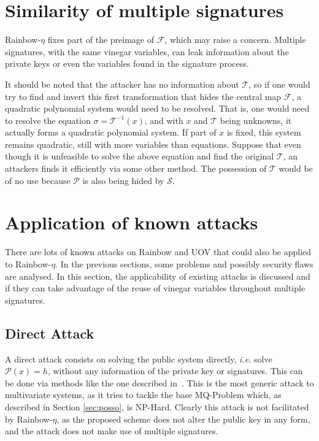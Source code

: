 \documentclass{ufsctex/ufsctex}
\begin{document}
\section{Similarity of multiple signatures}

Rainbow-$\eta$ fixes part of the preimage of $\mathcal{F}$, which may raise a
concern. Multiple signatures, with the same vinegar variables, can leak
information about the private keys or even the variables found in the signature
process.

It should be noted that the attacker has no information about $\mathcal{T}$, so
if one would try to find and invert this first transformation that hides the
central map $\mathcal{F}$, a quadratic polynomial system would need to be
resolved. That is, one would need to resolve the equation $\sigma =
\mathcal{T}^{-1}(x)$, and with $x$ and $\mathcal{T}$ being unknowns, it
actually forms a quadratic polynomial system. If part of $x$ is fixed, this
system remains quadratic, still with more variables than equations. Suppose
that even though it is unfeasible to solve the above equation and find the
original $\mathcal{T}$, an attackers finds it efficiently via some other
method. The possession of $\mathcal{T}$ would be of no use because
$\mathcal{P}$ is also being hided by $\mathcal{S}$. 

\section{Application of known attacks}

There are lots of known attacks on Rainbow and UOV that could also be applied
to Rainbow-$\eta$. In the previous sections, some problems and possibly
security flaws are analysed. In this section, the applicability of existing
attacks is discussed and if they can take advantage of the reuse of vinegar
variables throughout multiple signatures.

\subsection{Direct Attack}

A direct attack consists on solving the public system directly, \textit{i.e.}
solve $\mathcal{P}(x) = h$, without any information of the private key or
signatures. This can be done via methods like the one described
in~\cite{bettale2009hybrid}. This is the most generic attack to multivariate
systems, as it tries to tackle the base MQ-Problem which, as described in
Section \ref{sec:posso}, is NP-Hard. Clearly this attack is not facilitated by
Rainbow-$\eta$, as the proposed scheme does not alter the public key in any
form, and the attack does not make use of multiple signatures.
\end{document}
